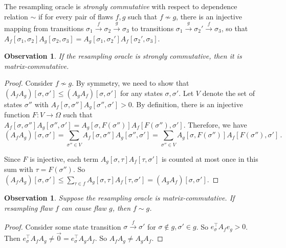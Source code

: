 \documentclass{toc}
\newtheorem{observation}[theorem]{Observation}
\begin{document}
\begin{definition}\label{commutative_algos1}
The resampling oracle is \emph{strongly commutative} with respect to  dependence relation $\sim$ if  for every pair of flaws $f, g $ such that $f \nsim g$, there is an injective mapping from transitions $\sigma_1 \xrightarrow{f} \sigma_2 \xrightarrow{g}  \sigma_3$ to  transitions $\sigma_1 \xrightarrow{g} \sigma_2' \xrightarrow{f} \sigma_3$, so that  $A_f[\sigma_1,\sigma_2] A_g[\sigma_2, \sigma_3] = A_g[\sigma_1,\sigma_2'] A_f[\sigma_2',\sigma_3]$.
\end{definition}

\begin{observation}\label{implies_original} 
  If the resampling oracle is strongly commutative, then it is matrix-commutative.
\end{observation}
\begin{proof}

  Consider $f \not \sim g$. By symmetry, we need to show that $(A_f A_g)[ \sigma, \sigma'] \leq (A_g A_f)[ \sigma, \sigma']$ for any states $\sigma, \sigma'$.  Let $V$ denote the set of states $\sigma''$ with $A_f[\sigma, \sigma''] A_g[ \sigma'', \sigma'] > 0$. By definition, there is an injective function $F: V \rightarrow \Omega$ such that $A_f[\sigma,\sigma''] A_g[\sigma'', \sigma'] = A_g[\sigma,F(\sigma'')] A_f[F(\sigma''),\sigma']$. Therefore, we have
  $$
  (A_f A_g) [ \sigma, \sigma' ] = \sum_{\sigma'' \in V} A_f[\sigma, \sigma''] A_g[\sigma'', \sigma'] = \sum_{\sigma'' \in V} A_g[\sigma,  F(\sigma'')] A_f[ F(\sigma''), \sigma' ]\,.
  $$

  Since $F$ is injective, each term $A_g[\sigma, \tau] A_f[ \tau, \sigma']$ is counted at most once in this sum with $\tau = F(\sigma'')$. So  $ (A_f A_g) [ \sigma, \sigma' ] \leq \sum_{\tau \in f} A_g[\sigma,\tau] A_f[ \tau, \sigma'] = (A_g A_f) [\sigma, \sigma']$.
  \end{proof}
  
 \begin{observation}
 \label{cause-obs}
 Suppose the resampling oracle is matrix-commutative. If resampling flaw $f$ can cause flaw $g$, then  $f \sim g$.
\end{observation}
\begin{proof}
Consider some state transition $\sigma \xrightarrow{f} \sigma'$ for $\sigma \notin g, \sigma' \in g$. So $e_{\sigma}^{\top} A_f e_g > 0$. Then  $e_{\sigma}^{\top} A_f A_g  \neq \vec 0 = e_{\sigma}^{\top} A_g A_f$. So $A_f A_g \neq A_g A_f$. 
\end{proof}
\end{document}
